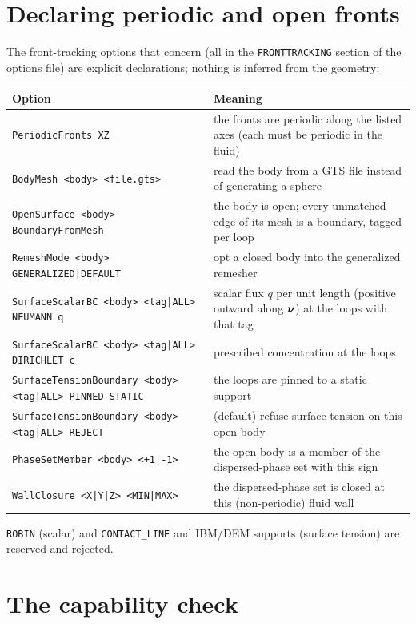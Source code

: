 \section{Declaring periodic and open fronts}

The front-tracking options that concern \mftl{} (all in the \texttt{FRONTTRACKING} section of the
options file) are explicit declarations; nothing is inferred from the geometry:
\begin{center}\small
\begin{tabularx}{\textwidth}{@{}lX@{}}
\toprule
Option & Meaning \\
\midrule
\texttt{PeriodicFronts XZ} & the fronts are periodic along the listed axes (each must be periodic in the fluid) \\
\texttt{BodyMesh <body> <file.gts>} & read the body from a GTS file instead of generating a sphere \\
\texttt{OpenSurface <body> BoundaryFromMesh} & the body is open; every unmatched edge of its mesh is a boundary, tagged per loop \\
\texttt{RemeshMode <body> GENERALIZED|DEFAULT} & opt a closed body into the generalized remesher \\
\texttt{SurfaceScalarBC <body> <tag|ALL> NEUMANN q} & scalar flux $q$ per unit length (positive outward along $\boldsymbol{\nu}$) at the loops with that tag \\
\texttt{SurfaceScalarBC <body> <tag|ALL> DIRICHLET c} & prescribed concentration at the loops \\
\texttt{SurfaceTensionBoundary <body> <tag|ALL> PINNED STATIC} & the loops are pinned to a static support \\
\texttt{SurfaceTensionBoundary <body> <tag|ALL> REJECT} & (default) refuse surface tension on this open body \\
\texttt{PhaseSetMember <body> <+1|-1>} & the open body is a member of the dispersed-phase set with this sign \\
\texttt{WallClosure <X|Y|Z> <MIN|MAX>} & the dispersed-phase set is closed at this (non-periodic) fluid wall \\
\bottomrule
\end{tabularx}
\end{center}
\texttt{ROBIN} (scalar) and \texttt{CONTACT\_LINE} and IBM/DEM supports (surface tension) are
reserved and rejected.

\section{The capability check}

